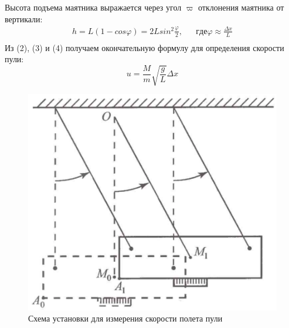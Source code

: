\documentclass[a4paper,12pt]{article} %
\begin{document}
Высота подъема маятника выражается через угол $\varpi$ отклонения маятника от вертикали:
\begin{equation}
\begin{aligned}
h = L(1-cos\varphi) = 2Lsin^2\frac{\varphi}{2}, & & где \varphi\approx\frac{\Delta x}{L}\\
\end{aligned}
\end{equation}
Из (2), (3) и (4) получаем окончательную формулу для определения скорости пули:
\begin{equation}
u = \frac{M}{m}\sqrt{\frac{g}{L}}\Delta x
\end{equation}
\begin{figure}[h]
\centering
\includegraphics[scale = 0.4]{2}
\caption{Схема установки для измерения скорости полета пули}
\end{figure}
\end{document}
